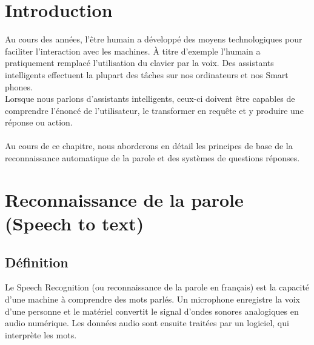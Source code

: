 
\section{Introduction}

Au cours des années, l’être humain a développé des moyens technologiques pour faciliter l'interaction avec les machines. À titre d’exemple l’humain a pratiquement remplacé l’utilisation du clavier par la voix. Des assistants intelligents effectuent la plupart des tâches sur nos ordinateurs et nos Smart phones.
\\Lorsque nous parlons d'assistants intelligents, ceux-ci doivent être capables de comprendre l'énoncé de l'utilisateur, le transformer en requête et y produire une réponse ou action. \\ \\Au cours de ce chapitre, nous aborderons en détail les principes de base de la reconnaissance automatique de la parole et des systèmes de questions réponses.

\section{Reconnaissance de la parole (Speech to text)}
\subsection{Définition}
Le Speech Recognition (ou reconnaissance de la parole en français) est la capacité d'une machine à comprendre des mots parlés. Un microphone enregistre la voix d'une personne et le matériel convertit le signal d'ondes sonores analogiques en audio numérique. Les données audio sont ensuite traitées par un logiciel, qui interprète les mots. \cite{speechrecdef}
\newpage
